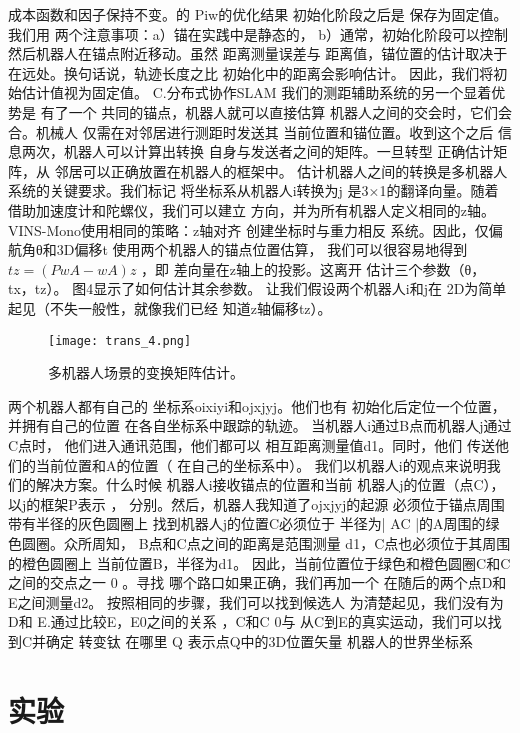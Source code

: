 \begin{translation}
成本函数和因子保持不变。的 Piw的优化结果 初始化阶段之后是 保存为固定值。我们用
两个注意事项：a）锚在实践中是静态的， b）通常，初始化阶段可以控制 然后机器人在锚点附近移动。虽然
距离测量误差与 距离值，锚位置的估计取决于 在远处。换句话说，轨迹长度之比 初始化中的距离会影响估计。
因此，我们将初始估计值视为固定值。 C.分布式协作SLAM 我们的测距辅助系统的另一个显着优势是 有了一个
共同的锚点，机器人就可以直接估算 机器人之间的交会时，它们会合。机械人 仅需在对邻居进行测距时发送其
当前位置和锚位置。收到这个之后 信息两次，机器人可以计算出转换 自身与发送者之间的矩阵。一旦转型
正确估计矩阵，从 邻居可以正确放置在机器人的框架中。 估计机器人之间的转换是多机器人系统的关键要求。我们标记
将坐标系从机器人i转换为j 是3×1的翻译向量。随着 借助加速度计和陀螺仪，我们可以建立
方向，并为所有机器人定义相同的z轴。 VINS-Mono使用相同的策略：z轴对齐 创建坐标时与重力相反
系统。因此，仅偏航角θ和3D偏移t 使用两个机器人的锚点位置估算， 我们可以很容易地得到$tz = (P w A-w A)z$
，即 差向量在z轴上的投影。这离开 估计三个参数（θ，tx，tz）。 图4显示了如何估计其余参数。
让我们假设两个机器人i和j在 2D为简单起见（不失一般性，就像我们已经 知道z轴偏移tz）。


\begin{figure}
  \centering
  \texttt{[image: trans\_4.png]}
  \caption{多机器人场景的变换矩阵估计。}
  \label{fig:gmapping}
\end{figure}

两个机器人都有自己的
坐标系oixiyi和ojxjyj。他们也有 初始化后定位一个位置，并拥有自己的位置 在各自坐标系中跟踪的轨迹。
当机器人i通过B点而机器人j通过C点时， 他们进入通讯范围，他们都可以 相互距离测量值d1。同时，他们
传送他们的当前位置和A的位置（ 在自己的坐标系中）。 我们以机器人i的观点来说明我们的解决方案。什么时候
机器人i接收锚点的位置和当前 机器人j的位置（点C），以j的框架P表示
， 分别。然后，机器人我知道了ojxjyj的起源 必须位于锚点周围带有半径的灰色圆圈上
找到机器人j的位置C必须位于 半径为| AC |的A周围的绿色圆圈。众所周知， B点和C点之间的距离是范围测量
d1，C点也必须位于其周围的橙色圆圈上 当前位置B，半径为d1。 因此，当前位置位于绿色和橙色圆圈C和C之间的交点之一
0
。寻找 哪个路口如果正确，我们再加一个 在随后的两个点D和E之间测量d2。 按照相同的步骤，我们可以找到候选人
为清楚起见，我们没有为D和 E.通过比较E，E0之间的关系 ，C和C 0与
从C到E的真实运动，我们可以找到C并确定 转变钛
在哪里
Q
表示点Q中的3D位置矢量
机器人的世界坐标系

\section{实验}


\end{translation}
